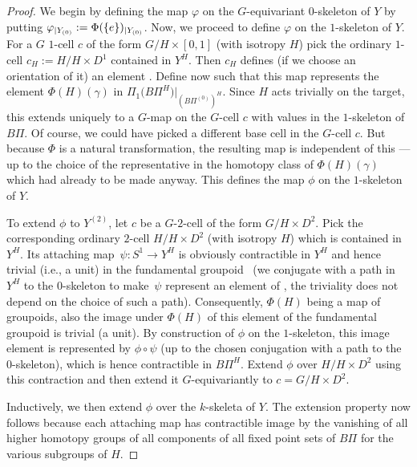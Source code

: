 \documentclass[10pt,a4paper]{amsart}
\begin{document}
	\begin{proof}
		We begin by defining the map $\varphi$ on the $G$-equivariant $0$-skeleton of $Y$ by putting
		$\varphi_{|Y_{(0)}}:=\smash{\Phi(\{e\})_{|Y_{(0)}}}$.
		Now, we proceed to define $\varphi$ on the $1$-skeleton of $Y$. For a $G$
		$1$-cell
		$c$ of the form $G/H\times [0,1]$ (with isotropy $H$) pick the ordinary
		$1$-cell $c_H:=H/H\times D^1$ contained in $Y^H$. Then $c_H$
		defines (if we choose an orientation of it) an element . Define now  such that
		this map represents the element $\Phi(H)(\gamma)$ in
		$\Pi_1\bigl(B\Pi^H\bigr)|_{ (B\Pi^{ (0)} )^H}$. Since $H$ acts trivially on the target, this extends
		uniquely to a $G$-map on the $G$-cell $c$ with values in the
		$1$-skeleton of $B\Pi$. Of course, we could have picked a different base cell
		in the $G$-cell $c$. But because $\Phi$ is a natural transformation, the
		resulting map is independent of this ---up to the choice of the representative in the
		homotopy class of $\Phi(H)(\gamma)$ which had already to be made anyway.
		This defines the map $\phi$ on the $1$-skeleton of $Y$.
		
		To extend $\phi$ to $Y^{(2)}$, let $c$ be a $G$-$2$-cell of the form
		$G/H\times D^2$. Pick the corresponding ordinary $2$-cell $H/H\times
		D^2$ (with isotropy $H$)
		which is contained in $Y^{H}$. Its attaching map~${\psi\colon S^1\to Y^{H}}$
		is obviously contractible in $Y^{H}$ and hence trivial (i.e., a unit) in
		the fundamental groupoid~ (we conjugate with a path in
		$Y^H$ to the $0$-skeleton to make~$\psi$
		represent an element of , the triviality does not
		depend on the choice of such a path). Consequently, $\Phi(H)$ being a map of
		groupoids, also the image under $\Phi(H)$ of this element of the fundamental
		groupoid is trivial (a unit). By construction of $\phi$ on the $1$-skeleton,
		this image element is represented by $\phi\circ\psi$ (up to the chosen
		conjugation with a path to the $0$-skeleton), which is hence contractible in
		$B\Pi^H$. Extend $\phi$ over $H/H\times D^2$ using this contraction and then
		extend it $G$-equivariantly to $c=G/H\times D^2$.
		
		Inductively, we then extend $\phi$ over the $k$-skeleta of $Y$. The extension
		property now follows because each attaching map has contractible image by the
		vanishing of all higher homotopy groups of all components of all fixed point
		sets of $B\Pi$ for the various subgroups of $H$.
		

\end{proof}
\end{document}
